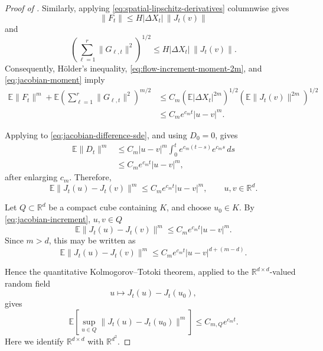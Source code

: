 \documentclass{tsp-short}
\theoremstyle{remark}
\theoremstyle{definition}
\newcommand{\R}{\mathbb{R}} %
\newcommand{\E}{\mathbb E} %
\begin{document}
\begin{proof}[Proof of ]
	Similarly, applying \eqref{eq:spatial-lipschitz-derivatives} columnwise gives
	\begin{equation*}
		\|F_t\| \le H|\Delta X_t|\,\|J_t(v)\|
	\end{equation*}
	and
	\begin{equation*}
		\left( \sum_{\ell=1}^{r}\|G_{\ell,t}\|^2 \right)^{1/2} \le H|\Delta X_t|\,\|J_t(v)\|.
	\end{equation*}
	Consequently, H\"older's inequality, \eqref{eq:flow-increment-moment-2m}, and \eqref{eq:jacobian-moment} imply
	\begin{align*}
		\E\|F_t\|^m + \E\left( \sum_{\ell=1}^{r}\|G_{\ell,t}\|^2 \right)^{m/2}
		 & \le C_m \left( \E|\Delta X_t|^{2m} \right)^{1/2} \left( \E\|J_t(v)\|^{2m} \right)^{1/2} \\
		 & \le C_me^{c_mt}|u-v|^m.
	\end{align*}

	Applying  to \eqref{eq:jacobian-difference-sde}, and using \(D_0=0\), gives
	\begin{align*}
		\E\|D_t\|^m & \le C_m|u-v|^m\int_0^t e^{c_m(t-s)}e^{c_ms}\,ds \\
		            & \le C_me^{c_mt}|u-v|^m,
	\end{align*}
	after enlarging \(c_m\). Therefore,
	\begin{equation}\label{eq:jacobian-increment}
		\E\|J_t(u)-J_t(v)\|^m \le C_me^{c_mt}|u-v|^m, \qquad u,v\in\R^d.
	\end{equation}

	Let \(Q\subset\R^d\) be a compact cube containing \(K\), and choose \(u_0\in K\). By \eqref{eq:jacobian-increment}, \( u,v\in Q \)
	\begin{equation*}
		\E\|J_t(u)-J_t(v)\|^m \le C_me^{c_mt}|u-v|^m.
	\end{equation*}
	Since \(m>d\), this may be written as
	\begin{equation*}
		\E\|J_t(u)-J_t(v)\|^m \le C_me^{c_mt}|u-v|^{d+(m-d)}.
	\end{equation*}

	Hence the quantitative Kolmogorov--Totoki theorem, applied to the \(\R^{d\times d}\)-valued random field
	\begin{equation*}
		u\longmapsto J_t(u)-J_t(u_0),
	\end{equation*}
	gives
	\begin{equation}\label{eq:kolmogorov-totoki-bound}
		\E\left[\sup_{u\in Q} \|J_t(u)-J_t(u_0)\|^m \right] \le C_{m,Q}e^{c_mt}.
	\end{equation}
	Here we identify \(\R^{d\times d}\) with \(\R^{d^2}\).


\end{proof}
\end{document}
